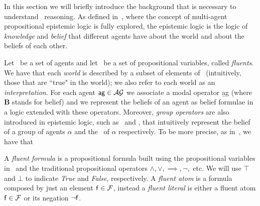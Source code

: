 In this section we will briefly introduce the background that is necessary to understand \mAGep\ reasoning.
As defined in~\cite{van2007dynamic,gerbrandy1999bisimulations}, where the concept of multi-agent propositional epistemic logic is fully explored, the epistemic
logic is the logic of \emph{knowledge} and \emph{belief} that different agents
have about the world and about the beliefs of each other.

Let \sAG\ be a set of  agents and let \sF\ be a set of propositional variables, called \emph{fluents}. 
We have that each \emph{world} is described by a
subset of elements of \sF\ (intuitively, those that are \textquotedblleft true" in the world); we also refer to each world as an \emph{interpretation}.
For each agent $\agent{ag} \in \sAG$ we associate a modal operator \b{ag}
(where $\mathbf{B}$ stands for belief) and we represent the beliefs of an agent
as belief formulae in a logic extended with these operators.
Moreover, \emph{group operators} are also introduced in epistemic logic, such as
\eAlpha\ and \cAlpha, that intuitively represent the belief of a group of agents $\alpha$ and
the \ck\ of $\alpha$ respectively.
To be more precise, as in~\cite{baral2015action}, we have that
\begin{definition} \label{def:fluent_formula}
  A \emph{fluent formula} is a propositional formula built using the propositional
  variables in \sF\ and the traditional propositional operators
  $\wedge,\vee,\implies,\neg,$ etc. We will use $\top$ and $\bot$ to indicate
  \emph{True} and \emph{False}, respectively.
  A \emph{fluent atom} is a formula composed by just an element $\mathsf{f} \in \mathcal{F}$, instead
  a \emph{fluent literal} is either a fluent atom $\mathsf{f} \in \mathcal{F}$ or its negation $\neg \mathsf{f}$.
\end{definition}

